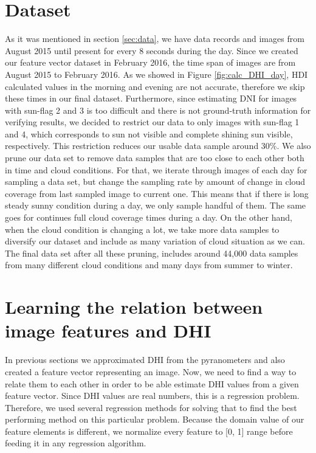 \section{Dataset}
As it was mentioned in section \ref{sec:data}, we have data records and images from August 2015 until present for every 8 seconds during the day. Since we created our feature vector dataset in February 2016, the time span of images are from August 2015 to February 2016. As we showed in Figure \ref{fig:calc_DHI_day}, HDI calculated values in the morning and evening are not accurate, therefore we skip these times in our final dataset. Furthermore, since estimating DNI for images with sun-flag 2 and 3 is too difficult and there is not ground-truth information for verifying results, we decided to restrict our data to only images with sun-flag 1 and 4, which corresponds to sun not visible and complete shining sun visible, respectively. This restriction reduces our usable data sample around 30\%. We also prune our data set to remove data samples that are too close to each other both in time and cloud conditions. For that, we iterate through images of each day for sampling a data set, but change the sampling rate by amount of change in cloud coverage from last sampled image to current one. This means that if there is long steady sunny condition during a day, we only sample handful of them. The same goes for continues full cloud coverage times during a day. On the other hand, when the cloud condition is changing a lot, we take more data samples to diversify our dataset and include as many variation of cloud situation as we can. The final data set after all these pruning, includes around 44,000 data samples from many different cloud conditions and many days from summer to winter.

\section{Learning the relation between image features and DHI}
In previous sections we approximated DHI from the pyranometers and also created a feature vector representing an image. Now, we need to find a way to relate them to each other in order to be able estimate DHI values from a given feature vector. Since DHI values are real numbers, this is a regression problem. 
Therefore, we used several regression methods for solving that to find the best performing method on this particular problem. Because the domain value of our feature elements is different, we normalize every feature to [0, 1] range before feeding it in any regression algorithm. 

